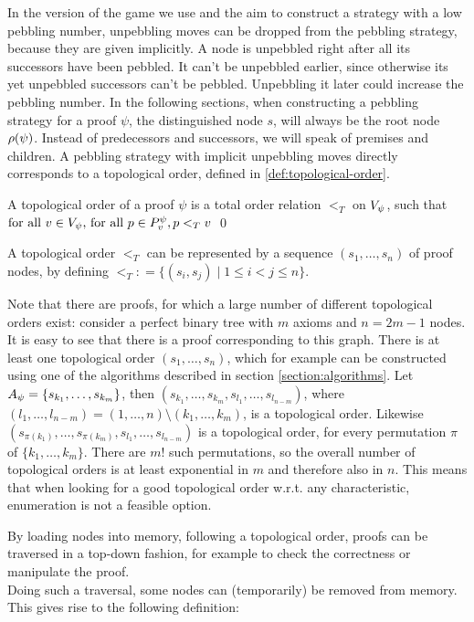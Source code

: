 \documentclass{llncs}
\newcommand{\defeq}{\mathrel{\mathop:}=}
\begin{document}
In the version of the game we use and the aim to construct a strategy with a low pebbling number, unpebbling moves can be dropped from the pebbling strategy, because they are given implicitly. 
A node is unpebbled right after all its successors have been pebbled. 
It can't be unpebbled earlier, since otherwise its yet unpebbled successors can't be pebbled. 
Unpebbling it later could increase the pebbling number.
In the following sections, when constructing a pebbling strategy for a proof $\psi$, the distinguished node $s$, will always be the root node $\rho(\psi)$. Instead of predecessors and successors, we will speak of premises and children.
A pebbling strategy with implicit unpebbling moves directly corresponds to a topological order, defined in \ref{def:topological-order}.

\begin{definition}
\label{def:topological-order}
A topological order of a proof $\psi$ is a total order relation $<_T$ on $V_{\psi}$, such that 
$
\text{for all } v \in V_{\psi} \text{, for all } p \in P_{v}^{\psi},
p <_T v
$
\qed
\end{definition}
A topological order $<_T$ can be represented by a sequence $(s_1,\dots,s_n)$ of proof nodes, by defining $<_T \defeq \{(s_i,s_j) \mid 1 \leq i < j \leq n\}$.

Note that there are proofs, for which a large number of different topological orders exist: consider a perfect binary tree with $m$ axioms and $n=2m-1$ nodes. It is easy to see that there is a proof corresponding to this graph.
There is at least one topological order $(s_1,\ldots,s_n)$, which for example can be constructed using one of the algorithms described in section \ref{section:algorithms}. 
Let $A_{\psi} = \{s_{k_1},\ldots,s_{k_m}\}$, then $(s_{k_1},\ldots,s_{k_m},s_{l_1},\ldots,s_{l_{n-m}})$, where $(l_1,\ldots,l_{n-m}) = (1,\ldots,n) \setminus (k_1,\ldots,k_m)$, is a topological order. 
Likewise $(s_{\pi({k_1})},\ldots,s_{\pi({k_m})},s_{l_1},\ldots,s_{l_{n-m}})$ is a topological order, for every permutation $\pi$ of $\{k_1,\ldots,k_m\}$. There are $m!$ such permutations, so the overall number of topological orders is at least exponential in $m$ and therefore also in $n$.
This means that when looking for a good topological order w.r.t. any characteristic, enumeration is not a feasible option.

\noindent 
By loading nodes into memory, following a topological order, proofs can be traversed in a top-down fashion, for example to check the correctness or manipulate the proof.\\
Doing such a traversal, some nodes can (temporarily) be removed from memory. This gives rise to the following definition:
\end{document}
